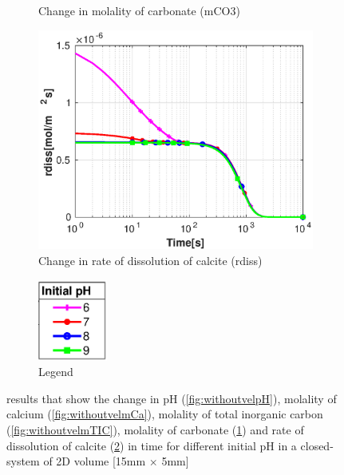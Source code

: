 \begin{figure}[!h]
\begin{subfigure}{.5\linewidth}
        \caption{Change in molality of carbonate (mCO3)}
        \label{fig:withoutvelmCO3}
    \end{subfigure}%
    \hfill
    \begin{subfigure}{.5\linewidth}
        \centering
        \includegraphics[width=\textwidth]{PICTURES/without_vel_rdiss.eps}
        \caption{Change in rate of dissolution of calcite (rdiss)}
        \label{fig:withoutvelrdiss}
    \end{subfigure}%
    \hfill
    \begin{subfigure}{.5\linewidth}
        \centering
        \includegraphics[width=0.25\textwidth]{PICTURES/with_pH_legend.eps}
        \caption{Legend}
        \label{fig:withoutvellegend}
    \end{subfigure}%
     \caption{\MATLAB results that show the change in pH (\cref{fig:withoutvelpH}), molality of calcium (\cref{fig:withoutvelmCa}), 
     molality of total inorganic carbon (\cref{fig:withoutvelmTIC}), molality of carbonate (\cref{fig:withoutvelmCO3}) 
     and rate of dissolution of calcite (\cref{fig:withoutvelrdiss}) in time for different initial pH in a closed-system of 2D volume [15mm $\times$ 5mm]}
     \label{fig:MATLABcomparisionDiffInitialpH}
\end{figure}


